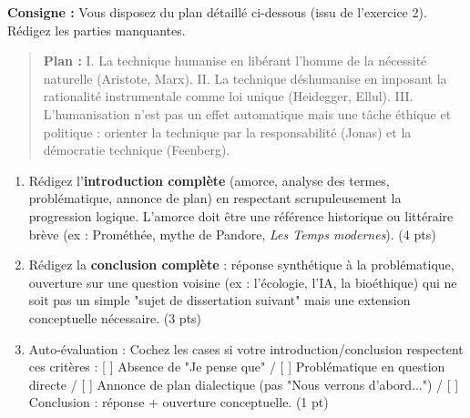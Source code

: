 \documentclass[11pt]{article}
\begin{document}
\begin{exercice}
\textbf{Consigne :} Vous disposez du plan détaillé ci-dessous (issu de l'exercice 2). Rédigez les parties manquantes.

\begin{quote}
\textbf{Plan :} 
I. La technique humanise en libérant l'homme de la nécessité naturelle (Aristote, Marx). 
II. La technique déshumanise en imposant la rationalité instrumentale comme loi unique (Heidegger, Ellul). 
III. L'humanisation n'est pas un effet automatique mais une tâche éthique et politique : orienter la technique par la responsabilité (Jonas) et la démocratie technique (Feenberg).
\end{quote}

\begin{enumerate}
    \item Rédigez l'\textbf{introduction complète} (amorce, analyse des termes, problématique, annonce de plan) en respectant scrupuleusement la progression logique. L'amorce doit être une référence historique ou littéraire brève (ex : Prométhée, mythe de Pandore, \textit{Les Temps modernes}). (4 pts)
    \item Rédigez la \textbf{conclusion complète} : réponse synthétique à la problématique, ouverture sur une question voisine (ex : l'écologie, l'IA, la bioéthique) qui ne soit pas un simple "sujet de dissertation suivant" mais une extension conceptuelle nécessaire. (3 pts)
    \item Auto-évaluation : Cochez les cases si votre introduction/conclusion respectent ces critères : [ ] Absence de "Je pense que" / [ ] Problématique en question directe / [ ] Annonce de plan dialectique (pas "Nous verrons d'abord...") / [ ] Conclusion : réponse + ouverture conceptuelle. (1 pt)
\end{enumerate}
\end{exercice}
\end{document}
